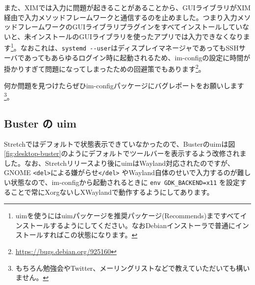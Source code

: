\documentclass[mingoth,a4paper]{jsarticle}
\begin{document}
また、XIMでは入力に問題が起きることがあることから、GUIライブラリがXIM経由で入力メソッドフレームワークと通信するのを止めました。つまり入力メソッドフレームワークのGUIライブラリプラグインをすべてインストールしていないと、未インストールのGUIライブラリを使ったアプリでは入力できなくなります\footnote{uimを使うにはuimパッケージを推奨パッケージ(Recommends)まですべてインストールするようにしてください。なおDebianインストーラで普通にインストールすればこの状態になります。}。なおこれは、\verb|systemd --user|はディスプレイマネージャであってもSSHサーバであってもあらゆるログイン時に起動されるため、im-configの設定に時間が掛かりすぎて問題になってしまったための回避策でもあります\footnote{\url{https://bugs.debian.org/925160}}。

何か問題を見つけたらぜひim-configパッケージにバグレポートをお願いします\footnote{もちろん勉強会やTwitter、メーリングリストなどで教えていただいても構いません。}。

\subsection{Buster の uim}
Stretchではデフォルトで状態表示できていなかったので、Busterのuimは図\ref{fig:desktop-buster}のようにデフォルトでツールバーを表示するよう改修されました。なお、Stretchリリースより後にuimはWayland対応されたのですが、GNOME \verb|<del>|による嫌がらせ\verb|</del>| やWayland自体のせいで入力するのが難しい状態なので、im-configから起動されるときに \verb|env GDK_BACKEND=x11| を設定することで常にXorgないしXWaylandで動作するようにしてあります。
\end{document}
